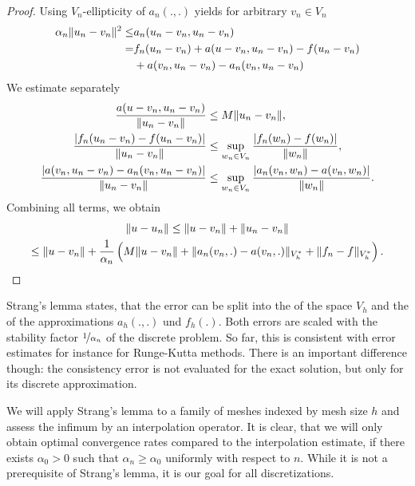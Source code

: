 \begin{proof}
  Using $V_n$-ellipticity of $a_n(.,.)$ yields for arbitrary $v_n\in V_n$
  \begin{align*}
    \alpha_n \lVert u_n-v_n\rVert^2
    \le &a_n(u_n-v_n,u_n-v_n)\\
    =& f_n(u_n-v_n) + a(u-v_n, u_n-v_n)
       - f(u_n-v_n)
    \\ &+ a(v_n,u_n-v_n) - a_n(v_n, u_n-v_n)
  \end{align*}
  We estimate separately
  \begin{align*}
    \frac{a(u-v_n, u_n-v_n)}{\lVert u_n-v_n\rVert}
    &\le M \lVert u_n-v_n\rVert,\\
    \frac{\lvert f_n(u_n-v_n) - f(u_n-v_n)\rvert}{\lVert u_n-v_n\rVert}
    &\le \sup_{w_n\in V_n} \frac{\lvert f_n(w_n)-f(w_n)\rvert}{\lVert w_n\rVert},
    \\
    \frac{\lvert a(v_n,u_n-v_n) - a_n(v_n, u_n-v_n)\rvert}{\lVert u_n-v_n\rVert}
    &\le \sup_{w_n\in V_n} \frac{\lvert a_n(v_n, w_n)-a(v_n,w_n)\rvert}{\lVert w_n\rVert}.
  \end{align*}
  Combining all terms, we obtain
  \begin{multline}
    \lVert u-u_n\rVert
    \le \lVert u-v_n\rVert + \lVert u_n-v_n\rVert \\
    \le \lVert u-v_n\rVert + \frac1{\alpha_n}\left(
         M \lVert u-v_n\rVert
         + \lVert a_n(v_n,.)-a(v_n,.)\rVert_{V_h^*}
         + \lVert f_n-f\rVert_{V_h^*}\right).
  \end{multline}
\end{proof}

\begin{remark}
  Strang's lemma states, that the error can be split into the
   of the space $V_h$ and the
   of the approximations $a_h(.,.)$ und
  $f_h(.)$. Both errors are scaled with the stability factor
  $\nicefrac1{\alpha _n}$ of the discrete problem. So far, this is
  consistent with error estimates for instance for Runge-Kutta
  methods. There is an important difference though: the consistency
  error is not evaluated for the exact solution, but only for its
  discrete approximation.
\end{remark}

\begin{remark}
  We will apply Strang's lemma to a family of meshes indexed by mesh
  size $h$ and assess the infimum by an interpolation operator. It is
  clear, that we will only obtain optimal convergence rates compared
  to the interpolation estimate, if there exists $\alpha_0 >0$ such
  that $\alpha_n \ge \alpha_0$ uniformly with respect to $n$. While it
  is not a prerequisite of Strang's lemma, it is our goal for all
  discretizations.
\end{remark}

